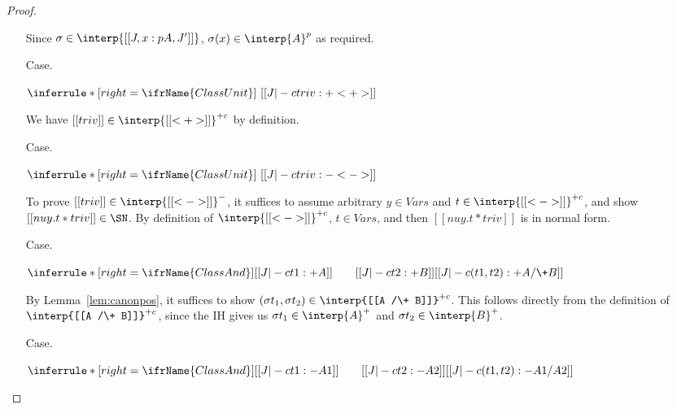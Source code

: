 \begin{proof}
\begin{itemize}
Since $\sigma\in\interp{[[J , x : p A, J']]}$, $\sigma(x)\in\interp{A}^p$ as required.

\item[Case.]\ 

\vspace{-.2cm}
\begin{center}
\begin{math}
\inferrule* [right=\ifrName{ClassUnit}] {\ }{[[J |-c triv : + < + >]]}
\end{math}
\end{center}

We have $[[triv]]\in\interp{[[<+>]]}^{+c}$ by definition.

\item[Case.]\ 

\vspace{-.2cm}
\begin{center}
\begin{math}
\inferrule* [right=\ifrName{ClassUnit}] {\ }{[[J |-c triv : - < - >]]}
\end{math}
\end{center}

To prove $[[triv]]\in\interp{[[<->]]}^{-}$, it suffices to assume
arbitrary $y\in\textit{Vars}$ and $t\in\interp{[[<->]]}^{+c}$, and
show $[[nu y . t * triv]]\in\SN$.  By definition of
$\interp{[[<->]]}^{+c}$, $t\in\textit{Vars}$, and then $[[nu y . t *
triv]]$ is in normal form.

\item[Case.]\ 

\vspace{-.2cm}
\begin{center}
\begin{math}
\inferrule* [right=\ifrName{ClassAnd}] {[[J |-c t1 : + A]] \qquad [[J |-c t2 : + B]]}{[[J |-c (t1,t2) : + A /\+ B]]}
\end{math}
\end{center}

By Lemma~\ref{lem:canonpos}, it suffices to show $(\sigma t_1,\sigma
t_2)\in\interp{[[A /\+ B]]}^{+c}$.  This follows directly from the
definition of $\interp{[[A /\+ B]]}^{+c}$, since the IH gives us
$\sigma t_1\in\interp{A}^+$ and $\sigma t_2\in\interp{B}^+$.

\item[Case.]\ 

\vspace{-.2cm}
\begin{center}
\begin{math}
\inferrule* [right=\ifrName{ClassAnd}] {[[J |-c t1 : - A1]] \qquad [[J |-c t2 : - A2]]}{[[J |-c (t1,t2) : - A1 /\- A2]]}
\end{math}
\end{center}


\end{itemize}
\end{proof}
